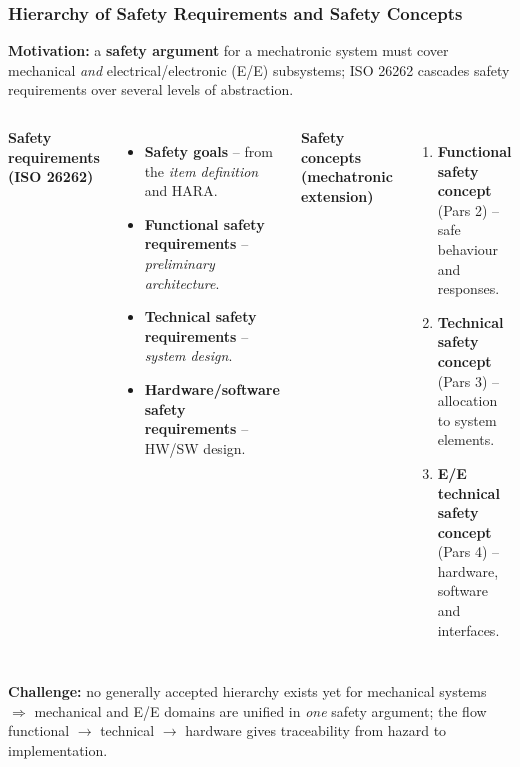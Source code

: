 \begin{frame}
	\frametitle{Hierarchy of Safety Requirements and Safety Concepts}
	\small
	\textbf{Motivation:} a \textbf{safety argument} for a mechatronic system must cover mechanical \emph{and} electrical/electronic (E/E) subsystems; ISO 26262 cascades safety requirements over several levels of abstraction.
	\begin{columns}[T,onlytextwidth]
		\textbf{Safety requirements (ISO 26262)}
		\begin{itemize}
			\item \textbf{Safety goals} -- from the \emph{item definition} and HARA.
			\item \textbf{Functional safety requirements} -- \emph{preliminary architecture}.
			\item \textbf{Technical safety requirements} -- \emph{system design}.
			\item \textbf{Hardware/software safety requirements} -- HW/SW design.
		\end{itemize}
		\textbf{Safety concepts (mechatronic extension)}
		\begin{enumerate}
			\item \textbf{Functional safety concept} (Pars 2) -- safe behaviour and responses.
			\item \textbf{Technical safety concept} (Pars 3) -- allocation to system elements.
			\item \textbf{E/E technical safety concept} (Pars 4) -- hardware, software and interfaces.
		\end{enumerate}
	\end{columns}
	\textbf{Challenge:} no generally accepted hierarchy exists yet for mechanical systems $\Rightarrow$ mechanical and E/E domains are unified in \emph{one} safety argument; the flow functional $\rightarrow$ technical $\rightarrow$ hardware gives traceability from hazard to implementation.
\end{frame}

